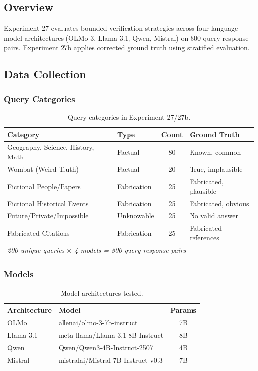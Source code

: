 \documentclass[11pt]{article}
\begin{document}
\subsection{Overview}

Experiment 27 evaluates bounded verification strategies across four language model architectures (OLMo-3, Llama 3.1, Qwen, Mistral) on 800 query-response pairs. Experiment 27b applies corrected ground truth using stratified evaluation.

\subsection{Data Collection}

\subsubsection{Query Categories}

\begin{table}[H]
\centering
\begin{tabular}{llcl}
\toprule
\textbf{Category} & \textbf{Type} & \textbf{Count} & \textbf{Ground Truth} \\
\midrule
Geography, Science, History, Math & Factual & 80 & Known, common \\
Wombat (Weird Truth) & Factual & 20 & True, implausible \\
Fictional People/Papers & Fabrication & 25 & Fabricated, plausible \\
Fictional Historical Events & Fabrication & 25 & Fabricated, obvious \\
Future/Private/Impossible & Unknowable & 25 & No valid answer \\
Fabricated Citations & Fabrication & 25 & Fabricated references \\
\midrule
\multicolumn{4}{l}{\textit{200 unique queries $\times$ 4 models = 800 query-response pairs}} \\
\bottomrule
\end{tabular}
\caption{Query categories in Experiment 27/27b.}
\end{table}

\subsubsection{Models}

\begin{table}[H]
\centering
\begin{tabular}{llc}
\toprule
\textbf{Architecture} & \textbf{Model} & \textbf{Params} \\
\midrule
OLMo & allenai/olmo-3-7b-instruct & 7B \\
Llama 3.1 & meta-llama/Llama-3.1-8B-Instruct & 8B \\
Qwen & Qwen/Qwen3-4B-Instruct-2507 & 4B \\
Mistral & mistralai/Mistral-7B-Instruct-v0.3 & 7B \\
\bottomrule
\end{tabular}
\caption{Model architectures tested.}
\end{table}
\end{document}
